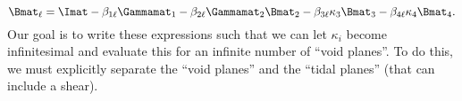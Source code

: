\begin{equation}
\Bmat_\ell = \Imat - \beta_{1\ell}\Gammamat_1  - \beta_{2\ell} \Gammamat_2 \Bmat_2  - \beta_{3\ell}\kappa_3 \Bmat_{3} - \beta_{4\ell} \kappa_{4} \Bmat_{4}.
\end{equation}
Our goal is to write these expressions such that we can let $\kappa_i$ become infinitesimal and evaluate this for an infinite number of ``void planes''. To do this, we must explicitly separate the ``void planes'' and the ``tidal planes'' (that can include a shear).
